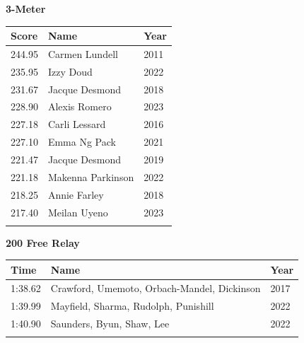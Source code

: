 \vspace{1.2em}
\noindent\begin{minipage}[t]{0.98\textwidth}
\centering
\textbf{\textcolor{teamprimary}{3-Meter}}\par
\vspace{0.5em}
\centering
\small
\renewcommand{\arraystretch}{1.0}
\setlength{\tabcolsep}{4pt}
\begin{tabular}{@{}p{1.8cm}p{3.0cm}p{1.0cm}@{}}
\toprule
\textbf{Score} & \textbf{Name} & \textbf{Year} \\
\midrule
244.95 & Carmen Lundell & 2011 \\
235.95 & Izzy Doud & 2022 \\
231.67 & Jacque Desmond & 2018 \\
228.90 & Alexis Romero & 2023 \\
227.18 & Carli Lessard & 2016 \\
227.10 & Emma Ng Pack & 2021 \\
221.47 & Jacque Desmond & 2019 \\
221.18 & Makenna Parkinson & 2022 \\
218.25 & Annie Farley & 2018 \\
217.40 & Meilan Uyeno & 2023 \\
\bottomrule
\vspace{0.5em}
\end{tabular}
\end{minipage}
\vspace{1.2em}
\noindent\begin{minipage}[t]{0.98\textwidth}
\centering
\textbf{\textcolor{teamprimary}{200 Free Relay}}\par
\vspace{0.5em}
\centering
\small
\renewcommand{\arraystretch}{1.0}
\setlength{\tabcolsep}{4pt}
\begin{tabular}{@{}p{4.5cm}p{8.5cm}p{2.5cm}@{}}
\toprule
\textbf{Time} & \textbf{Name} & \textbf{Year} \\
\midrule
1:38.62 & Crawford, Umemoto, Orbach-Mandel, Dickinson & 2017 \\
1:39.99 & Mayfield, Sharma, Rudolph, Punishill & 2022 \\
1:40.90 & Saunders, Byun, Shaw, Lee & 2022 \\
\bottomrule
\vspace{0.5em}
\end{tabular}
\end{minipage}
\vspace{1.2em}
